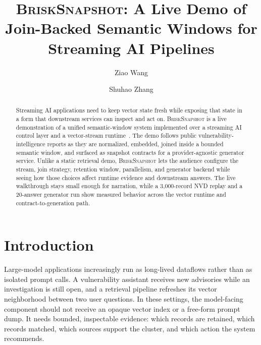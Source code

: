 \documentclass[sigconf]{acmart}
\newcommand{\system}{\textsc{BriskSnapshot}}
\begin{document}
\title{\system{}: A Live Demo of Join-Backed Semantic Windows for Streaming AI Pipelines}

\author{Ziao Wang}

\author{Shuhao Zhang}

\begin{abstract}
Streaming AI applications need to keep vector state fresh while exposing that state in a form that downstream services can inspect and act on. \system{} is a live demonstration of a unified semantic-window system implemented over a streaming AI control layer and a vector-stream runtime~\cite{sage_icml2026}. The demo follows public vulnerability-intelligence reports as they are normalized, embedded, joined inside a bounded semantic window, and surfaced as snapshot contracts for a provider-agnostic generator service. Unlike a static retrieval demo, \system{} lets the audience configure the stream, join strategy, retention window, parallelism, and generator backend while seeing how those choices affect runtime evidence and downstream answers. The live walkthrough stays small enough for narration, while a 3,000-record NVD replay and a 20-answer generator run show measured behavior across the vector runtime and contract-to-generation path.
\end{abstract}



\maketitle

\section{Introduction}

Large-model applications increasingly run as long-lived dataflows rather than as isolated prompt calls. A vulnerability assistant receives new advisories while an investigation is still open, and a retrieval pipeline refreshes its vector neighborhood between two user questions. In these settings, the model-facing component should not receive an opaque vector index or a free-form prompt dump. It needs bounded, inspectable evidence: which records are retained, which records matched, which sources support the cluster, and which action the system recommends.
\end{document}
